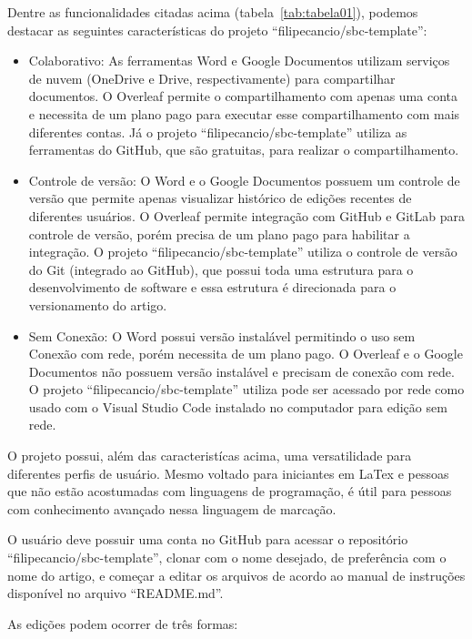 Dentre as funcionalidades citadas acima (tabela~\ref{tab:tabela01}), podemos destacar as seguintes características do projeto ``filipecancio/sbc-template'':

\begin{itemize}
	\item Colaborativo: As ferramentas Word e Google Documentos utilizam serviços de nuvem (OneDrive e Drive, respectivamente) para compartilhar documentos. O Overleaf permite o compartilhamento com apenas uma conta e necessita de um plano pago para executar esse compartilhamento com mais diferentes contas. Já o projeto ``filipecancio/sbc-template'' utiliza as ferramentas do GitHub, que são gratuitas, para realizar o compartilhamento.
	\item Controle de versão: O Word e o Google Documentos possuem um controle de versão que permite apenas visualizar histórico de edições recentes de diferentes usuários. O Overleaf permite integração com GitHub e GitLab para controle de versão, porém precisa de um plano pago para habilitar a integração. O projeto ``filipecancio/sbc-template'' utiliza o controle de versão do Git (integrado ao GitHub), que possui toda uma estrutura para o desenvolvimento de software e essa estrutura é direcionada para o versionamento do artigo.
	\item Sem Conexão: O Word possui versão instalável permitindo o uso sem Conexão com rede, porém necessita de um plano pago. O Overleaf e o Google Documentos não possuem versão instalável e precisam de conexão com rede. O projeto ``filipecancio/sbc-template'' utiliza pode ser acessado por rede como usado com o Visual Studio Code instalado no computador para edição sem rede.
\end{itemize}

O projeto possui, além das caracteristícas acima, uma versatilidade para diferentes perfis de usuário. Mesmo voltado para iniciantes em LaTex e pessoas que não estão acostumadas com linguagens de programação, é útil para pessoas com conhecimento avançado nessa linguagem de marcação. 

O usuário deve possuir uma conta no GitHub para acessar o repositório ``filipecancio/sbc-template'', clonar com o nome desejado, de preferência com o nome do artigo, e começar a editar os arquivos de acordo ao manual de instruções disponível no arquivo ``README.md''.

As edições podem ocorrer de três formas:


